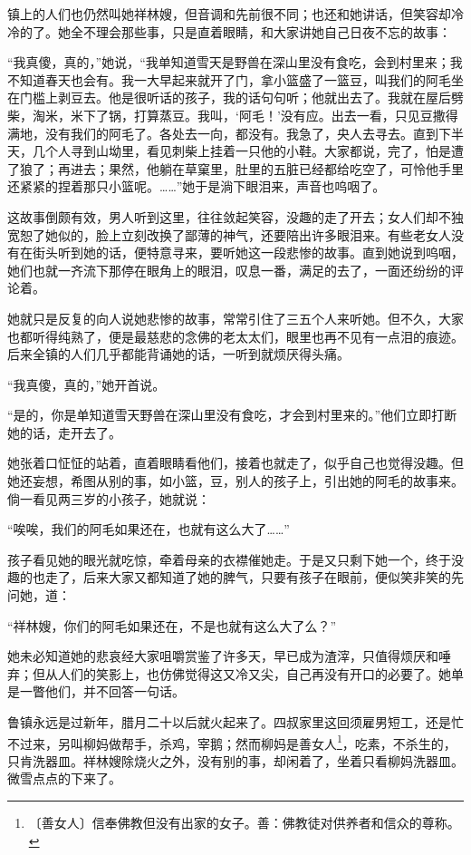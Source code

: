 \documentclass[12pt,UTF-8,openany]{ctexbook}
\begin{document}
\begin{normalsize}
    镇上的人们也仍然叫她祥林嫂，但音调和先前很不同；也还和她讲话，但笑容却冷冷的了。她全不理会那些事，只是直着眼睛，和大家讲她自己日夜不忘的故事：
    
    “我真傻，真的，”她说，“我单知道雪天是野兽在深山里没有食吃，会到村里来；我不知道春天也会有。我一大早起来就开了门，拿小篮盛了一篮豆，叫我们的阿毛坐在门槛上剥豆去。他是很听话的孩子，我的话句句听；他就出去了。我就在屋后劈柴，淘米，米下了锅，打算蒸豆。我叫，‘阿毛！’没有应。出去一看，只见豆撒得满地，没有我们的阿毛了。各处去一向，都没有。我急了，央人去寻去。直到下半天，几个人寻到山坳里，看见刺柴上挂着一只他的小鞋。大家都说，完了，怕是遭了狼了；再进去；果然，他躺在草窠里，肚里的五脏已经都给吃空了，可怜他手里还紧紧的捏着那只小篮呢。……”她于是淌下眼泪来，声音也呜咽了。
    
    这故事倒颇有效，男人听到这里，往往敛起笑容，没趣的走了开去；女人们却不独宽恕了她似的，脸上立刻改换了鄙薄的神气，还要陪出许多眼泪来。有些老女人没有在街头听到她的话，便特意寻来，要听她这一段悲惨的故事。直到她说到呜咽，她们也就一齐流下那停在眼角上的眼泪，叹息一番，满足的去了，一面还纷纷的评论着。
    
    她就只是反复的向人说她悲惨的故事，常常引住了三五个人来听她。但不久，大家也都听得纯熟了，便是最慈悲的念佛的老太太们，眼里也再不见有一点泪的痕迹。后来全镇的人们几乎都能背诵她的话，一听到就烦厌得头痛。
    
    “我真傻，真的，”她开首说。
    
    “是的，你是单知道雪天野兽在深山里没有食吃，才会到村里来的。”他们立即打断她的话，走开去了。
    
    她张着口怔怔的站着，直着眼睛看他们，接着也就走了，似乎自己也觉得没趣。但她还妄想，希图从别的事，如小篮，豆，别人的孩子上，引出她的阿毛的故事来。倘一看见两三岁的小孩子，她就说：
    
    “唉唉，我们的阿毛如果还在，也就有这么大了……”
    
    孩子看见她的眼光就吃惊，牵着母亲的衣襟催她走。于是又只剩下她一个，终于没趣的也走了，后来大家又都知道了她的脾气，只要有孩子在眼前，便似笑非笑的先问她，道：
    
    “祥林嫂，你们的阿毛如果还在，不是也就有这么大了么？”
    
    她未必知道她的悲哀经大家咀嚼赏鉴了许多天，早已成为渣滓，只值得烦厌和唾弃；但从人们的笑影上，也仿佛觉得这又冷又尖，自己再没有开口的必要了。她单是一瞥他们，并不回答一句话。
    
    鲁镇永远是过新年，腊月二十以后就火起来了。四叔家里这回须雇男短工，还是忙不过来，另叫柳妈做帮手，杀鸡，宰鹅；然而柳妈是善女人\footnote{〔善女人〕信奉佛教但没有出家的女子。善：佛教徒对供养者和信众的尊称。}，吃素，不杀生的，只肯洗器皿。祥林嫂除烧火之外，没有别的事，却闲着了，坐着只看柳妈洗器皿。微雪点点的下来了。
    

\end{normalsize}
\end{document}
